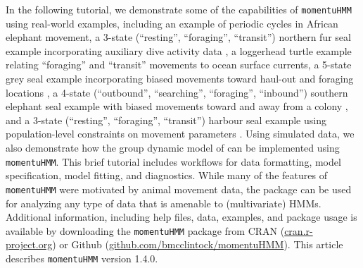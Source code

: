 \documentclass[12pt]{article}\usepackage[]{graphicx}\usepackage[]{color}
\begin{document}
In the following tutorial, we demonstrate some of the capabilities of \verb|momentuHMM| using real-world examples, including an example of periodic cycles in African elephant movement, a 3-state (``resting'', ``foraging'', ``transit'') northern fur seal example incorporating auxiliary dive activity data \citep{McClintockEtAl2014b}, a loggerhead turtle example relating ``foraging'' and ``transit'' movements to ocean surface currents, a 5-state grey seal example incorporating biased movements toward haul-out and foraging locations \citep{McClintockEtAl2012}, a 4-state (``outbound'', ``searching'', ``foraging'', ``inbound'') southern elephant seal example with biased movements toward and away from a colony \citep{MichelotEtAl2017}, and a 3-state (``resting'', ``foraging'', ``transit'') harbour seal example using population-level constraints on movement parameters \citep{McClintockEtAl2013c}. Using simulated data, we also demonstrate how the group dynamic model of \cite{LangrockEtAl2014} can be implemented using \verb|momentuHMM|. This brief tutorial includes workflows for data formatting, model specification, model fitting, and diagnostics. While many of the features of \verb|momentuHMM| were motivated by animal movement data, the package can be used for analyzing any type of data that is amenable to (multivariate) HMMs.  Additional information, including help files, data, examples, and package usage is available by downloading the \verb|momentuHMM| package from CRAN (\url{cran.r-project.org}) or Github (\url{github.com/bmcclintock/momentuHMM}). This article describes \verb|momentuHMM| version 1.4.0.
\end{document}

